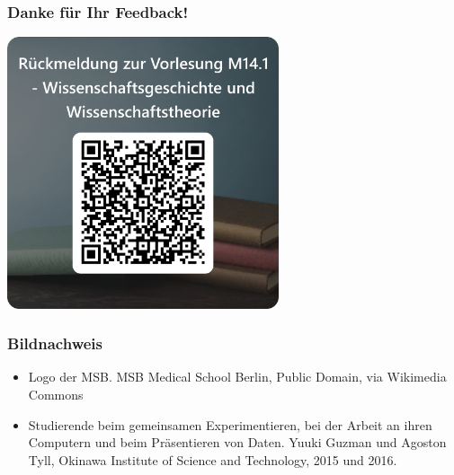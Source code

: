 \documentclass{beamer}
\begin{document}

\begin{frame}
\frametitle{Danke für Ihr Feedback!}
\begin{center}
\includegraphics[width=0.6\textwidth]{feedback_QR.png}
\end{center}

\end{frame}





\begin{frame}
\frametitle{Bildnachweis}

\vfill

\begin{tiny}
 
\begin{itemize}

\item
Logo der MSB. MSB Medical School Berlin, Public Domain, via Wikimedia Commons
\item 
Studierende beim gemeinsamen Experimentieren, bei der Arbeit an ihren Computern und beim Präsentieren von Daten. Yuuki Guzman und Agoston Tyll, Okinawa Institute of Science and Technology, 2015 und 2016. 
\end{itemize}
\end{tiny}
\end{frame}
\end{document}
